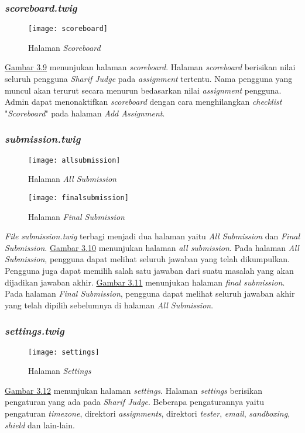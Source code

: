 \subsubsection{\textit{scoreboard.twig}}
\begin{figure}[H]
	\centering  
	\texttt{[image: scoreboard]}  
	\caption[Halaman \textit{Scoreboard}]{Halaman \textit{Scoreboard}} 
	\label{fig:scoreboard} 
\end{figure} 
\hyperref[fig:scoreboard]{Gambar 3.9} menunjukan halaman \textit{scoreboard}. Halaman \textit{scoreboard} berisikan nilai seluruh pengguna \textit{Sharif Judge} pada \textit{assignment} tertentu. Nama pengguna yang muncul akan terurut secara menurun bedasarkan nilai \textit{assignment} pengguna. Admin dapat menonaktifkan \textit{scoreboard} dengan cara menghilangkan \textit{checklist} "\textit{Scoreboard}" pada halaman \textit{Add Assignment}.

\subsubsection{\textit{submission.twig}}
\begin{figure}[H]
	\centering  
	\texttt{[image: allsubmission]}  
	\caption[Halaman \textit{All Submission}]{Halaman \textit{All Submission}} 
	\label{fig:allsubmission} 
\end{figure} 

\begin{figure}[H]
	\centering  
	\texttt{[image: finalsubmission]}  
	\caption[Halaman \textit{Final Submission}]{Halaman \textit{Final Submission}} 
	\label{fig:finalsubmission} 
\end{figure} 

 \textit{File} \textit{submission.twig} terbagi menjadi dua halaman yaitu \textit{All Submission} dan \textit{Final Submission}. \hyperref[fig:allsubmission]{Gambar 3.10} menunjukan halaman \textit{all submission}. Pada halaman \textit{All Submission}, pengguna dapat melihat seluruh jawaban yang telah dikumpulkan. Pengguna juga dapat memilih salah satu jawaban dari suatu masalah yang akan dijadikan jawaban akhir. \hyperref[fig:finalsubmission]{Gambar 3.11} menunjukan halaman \textit{final submission}. Pada halaman \textit{Final Submission}, pengguna dapat melihat seluruh jawaban akhir yang telah dipilih sebelumnya di halaman \textit{All Submission}.

\subsubsection{\textit{settings.twig}}
\begin{figure}[H]
	\centering  
	\texttt{[image: settings]}  
	\caption[Halaman \textit{Settings}]{Halaman \textit{Settings}} 
	\label{fig:settings} 
\end{figure} 
\hyperref[fig:settings]{Gambar 3.12} menunjukan halaman \textit{settings}. Halaman \textit{settings} berisikan pengaturan yang ada pada \textit{Sharif Judge}. Beberapa pengaturannya yaitu pengaturan \textit{timezone}, direktori \textit{assignments}, direktori \textit{tester}, \textit{email}, \textit{sandboxing}, \textit{shield} dan lain-lain.

